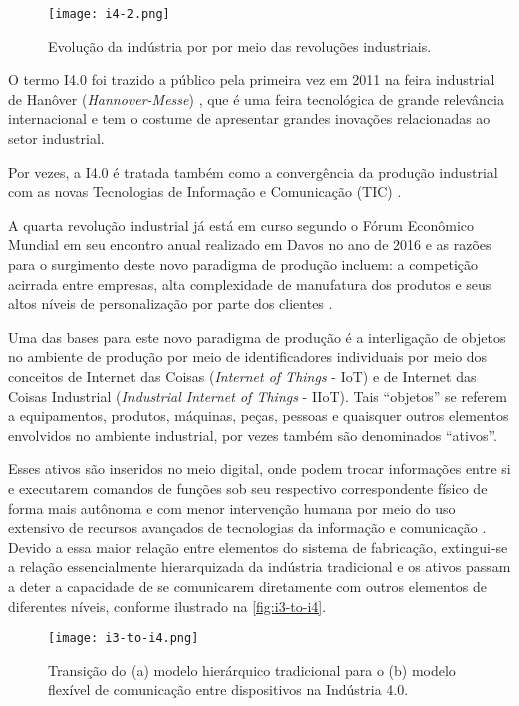	\begin{figure}[htb]
		\centering
		\caption{Evolução da indústria por por meio das revoluções industriais.}
		\label{fig:i4-2}
		\texttt{[image: i4-2.png]}
	\end{figure}

	O termo I4.0 foi trazido a público pela primeira vez em 2011 na feira industrial de Hanôver (\textit{Hannover-Messe}) \cite{kagermann2011industrie}, que é uma feira tecnológica de grande relevância internacional e tem o costume de apresentar grandes inovações relacionadas ao setor industrial.

	Por vezes, a I4.0 é tratada também como a convergência da produção industrial com as novas Tecnologias de Informação e Comunicação (TIC) \cite{hermann2016design}.

	A quarta revolução industrial já está em curso segundo o Fórum Econômico Mundial \cite{schwab2016fourth} em seu encontro anual realizado em Davos no ano de 2016 e as razões para o surgimento deste novo paradigma de produção incluem: a competição acirrada entre empresas, alta complexidade de manufatura dos produtos e seus altos níveis de personalização por parte dos clientes \cite{bordeleau2018bi, vaidya2018industryfour}.

	Uma das bases para este novo paradigma de produção é a interligação de objetos no ambiente de produção por meio de identificadores individuais por meio dos conceitos de Internet das Coisas (\textit{Internet of Things} - IoT) e de Internet das Coisas Industrial (\textit{Industrial Internet of Things} - IIoT). Tais ``objetos'' se referem a equipamentos, produtos, máquinas, peças, pessoas e quaisquer outros elementos envolvidos no ambiente industrial, por vezes também são denominados ``ativos''.
	
	Esses ativos são inseridos no meio digital, onde podem trocar informações entre si e executarem comandos de funções sob seu respectivo correspondente físico de forma mais autônoma e com menor intervenção humana por meio do uso extensivo de recursos avançados de tecnologias da informação e comunicação \cite{adolph2018roadmap}. Devido a essa maior relação entre elementos do sistema de fabricação, extingui-se a relação essencialmente hierarquizada da indústria tradicional e os ativos passam a deter a capacidade de se comunicarem diretamente com outros elementos de diferentes níveis, conforme ilustrado na \autoref{fig:i3-to-i4}.
	
	\begin{figure}[htb]
		\centering
		\caption{Transição do (a) modelo hierárquico tradicional para o (b) modelo flexível de comunicação entre dispositivos na Indústria 4.0.}
		\label{fig:i3-to-i4}
		\texttt{[image: i3-to-i4.png]}
	\end{figure}

